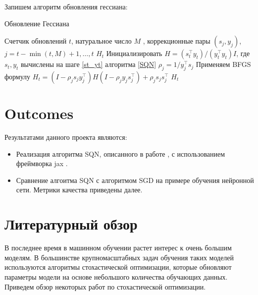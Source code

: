 \documentclass[]{scrartcl}
\begin{document}
Запишем алгоритм обновления гессиана:

\begin{algorithm}[H]
	\caption{Обновление Гессиана}
	\label{hess_updating}
	\begin{algorithmic}[1]
	\REQUIRE Счетчик обновлений $t$, натуральное число $M$ , коррекционные пары $(s_j, y_j)$,\\$j = t - \min(t, M) + 1, \ldots, t$
	\ENSURE $H_t$
	\STATE Инициализировать $H = (s_t^\top y_t)/(y_t^\top y_t)I$, где $s_t, y_t$ вычислены на шаге \ref{st_yt} алгоритма \ref{SQN}
		\STATE $\rho_j = 1/y_j^\top s_j$
		\STATE Применяем  BFGS формулу $H_t = (I - \rho_js_jy_j^\top)H(I - \rho_jy_js_j^\top) + \rho_js_js_j^\top$
	\ENDFOR
	\RETURN $H_t$
	\end{algorithmic}
\end{algorithm}



\section{Outcomes}
Результатами данного проекта являются:
\begin{itemize}
\item Реализация алгоритма SQN, описанного в работе \cite{journals/siamjo/ByrdHNS16}, с использованием фреймворка jax \cite{jax2018github}.

\item Сравнение алгоитма SQN \cite{journals/siamjo/ByrdHNS16} с алгоритмом SGD на примере обучения нейронной сети. Метрики качества приведены далее.
\end{itemize}



\section{Литературный обзор}

В последнее время в машинном обучении растет интерес к очень большим моделям. В большинстве крупномасштабных задач обучения таких моделей используются алгоритмы стохастической оптимизации, которые обновляют параметры модели на основе небольшого количества обучающих данных. Приведем обзор некоторых работ по стохастической оптимизации.
\end{document}
